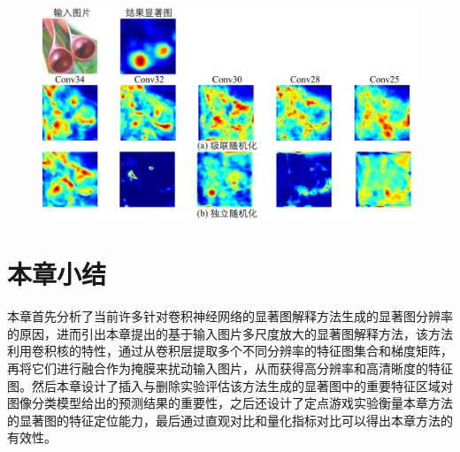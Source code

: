 \begin{figure}[h]
	\centering 
	\includegraphics[width=15cm]{fig/ch3/sanityCheck.pdf}
	\label{fig:sanitycheck}
\end{figure}


\section{本章小结}
本章首先分析了当前许多针对卷积神经网络的显著图解释方法生成的显著图分辨率的原因，进而引出本章提出的基于输入图片多尺度放大的显著图解释方法，该方法利用卷积核的特性，通过从卷积层提取多个不同分辨率的特征图集合和梯度矩阵，再将它们进行融合作为掩膜来扰动输入图片，从而获得高分辨率和高清晰度的特征图。然后本章设计了插入与删除实验评估该方法生成的显著图中的重要特征区域对图像分类模型给出的预测结果的重要性，之后还设计了定点游戏实验衡量本章方法的显著图的特征定位能力，最后通过直观对比和量化指标对比可以得出本章方法的有效性。